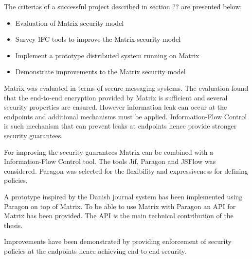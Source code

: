 
The criterias of a successful project described in section ?? are presented below:

\begin{itemize}
	\item Evaluation of Matrix security model
	\item Survey IFC tools to improve the Matrix security model
	\item Implement a prototype distributed system running on Matrix
	\item Demonstrate improvements to the Matrix security model
\end{itemize} 

Matrix was evaluated in terms of secure messaging systems. The evaluation found that the end-to-end encryption provided by Matrix is sufficient and several security properties are ensured. However information leak can occur at the endpoints and additional mechanisms must be applied. Information-Flow Control is such mechanism that can prevent leaks at endpoints hence provide stronger security guarantees.

For improving the security guarantees Matrix can be combined with a Information-Flow Control tool. The tools Jif, Paragon and JSFlow was considered.  Paragon was selected for the flexibility and expressiveness for defining policies.

A prototype inspired by the Danish journal system has been implemented using Paragon on top of Matrix. To be able to use Matrix with Paragon an API for Matrix has been provided. The API is the main technical contribution of the thesis. 

Improvements have been demonstrated by providing enforcement of security policies at the endpoints hence achieving end-to-end security.



